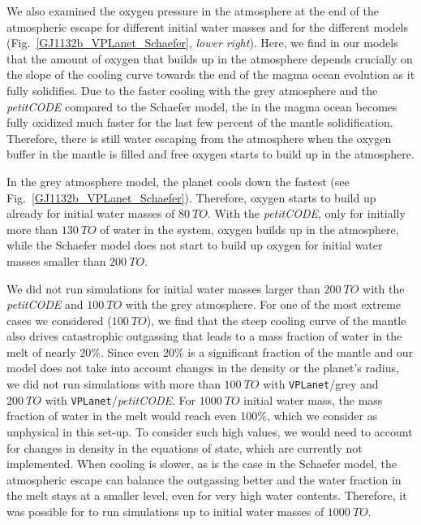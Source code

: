 \documentclass[paper=letterpaper,fontsize=12pt,oneside,twocolumn]{article}
\newcommand{\vplanet}{\texttt{\footnotesize{VPLanet}}}
\newcommand{\petit}{\textit{petitCODE}}
\begin{document}
We also examined the oxygen pressure in the atmosphere at the end of the atmospheric escape for different initial water masses and for the different models (Fig.~\ref{GJ1132b_VPLanet_Schaefer}, \textit{lower right}). Here, we find in our models that the amount of oxygen that builds up in the atmosphere depends crucially on the slope of the cooling curve towards the end of the magma ocean evolution as it fully solidifies.  Due to the faster cooling with the grey atmosphere and the \petit{} compared to the Schaefer model, the  in the magma ocean becomes fully oxidized much faster for the last few percent of the mantle solidification. Therefore, there is still water escaping from the atmosphere when the oxygen buffer in the mantle is filled and free oxygen starts to build up in the atmosphere.

In the grey atmosphere model, the planet cools down the fastest (see Fig.~\ref{GJ1132b_VPLanet_Schaefer}).
Therefore, oxygen starts to build up already for initial water masses of $\SI{80}{TO}$. 
With the \petit{}, only for initially more than $\SI{130}{TO}$ of water in the system, oxygen builds up in the atmosphere, while the Schaefer model does not start to build up oxygen for initial water masses smaller than $\SI{200}{TO}$.

We did not run simulations for initial water masses larger than $\SI{200}{TO}$ with the \petit{} and $\SI{100}{TO}$ with the grey atmosphere. For one of the most extreme cases we considered ($\SI{100}{TO}$), we find that the steep cooling curve of the mantle also drives catastrophic outgassing that leads to a mass fraction of water in the melt of nearly 20\%. Since even 20\% is a significant fraction of the mantle and our model does not take into account changes in the density or the planet's radius, we did not run simulations with more than $\SI{100}{TO}$ with \vplanet{}/grey and $\SI{200}{TO}$ with \vplanet{}/\petit{}. For $\SI{1000}{TO}$ initial water mass, the mass fraction of water in the melt would reach even 100\%, which we consider as unphysical in this set-up. To consider such high values, we would need to account for changes in density in the equations of state, which are currently not implemented.
When cooling is slower, as is the case in the Schaefer model, the atmospheric escape can balance the outgassing better and the water fraction in the melt stays at a smaller level, even for very high water contents. Therefore, it was possible for \citet{Schaefer2016} to run simulations up to initial water masses of $\SI{1000}{TO}$.
\end{document}
